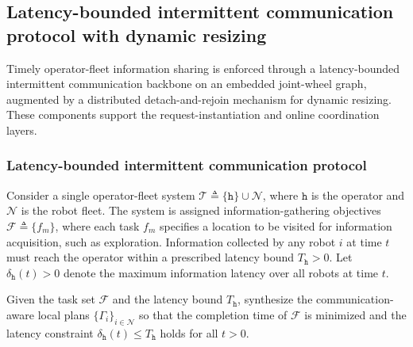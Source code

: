 \subsection{Latency-bounded intermittent communication protocol with dynamic resizing}
\label{ch05:subsec:spread}

Timely operator-fleet information sharing is enforced through a
latency-bounded intermittent communication backbone on an embedded joint-wheel
graph, augmented by a distributed detach-and-rejoin mechanism for dynamic
resizing. These components support the request-instantiation and online
coordination layers.

\subsubsection{Latency-bounded intermittent communication protocol}
\label{ch05:subsubsec:spread-problem}

Consider a single operator-fleet system
$\mathcal{T} \triangleq \{\texttt{h}\} \cup \mathcal{N}$, where
$\texttt{h}$ is the operator and $\mathcal{N}$ is the robot fleet. The system
is assigned information-gathering objectives
$\mathcal{F} \triangleq \{f_m\}$, where each task $f_m$ specifies a location to
be visited for information acquisition, such as exploration. Information
collected by any robot $i$ at time $t$ must reach the operator within a
prescribed latency bound $T_{\texttt{h}} > 0$. Let
$\delta_{\texttt{h}}(t) > 0$ denote the maximum information latency over all
robots at time $t$.

\begin{problem}
\label{ch05:prob:latency}
Given the task set $\mathcal{F}$ and the latency bound $T_{\texttt{h}}$,
synthesize the communication-aware local plans $\{\Gamma_i\}_{i \in \mathcal{N}}$ so that the
completion time of $\mathcal{F}$ is minimized and the latency constraint
$\delta_{\texttt{h}}(t) \leq T_{\texttt{h}}$ holds for all $t > 0$.
\end{problem}

